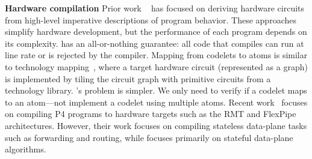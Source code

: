 \textbf{Hardware compilation}
Prior work ~\cite{nurvadathi, cash, bluespec} has focused on deriving hardware
circuits from high-level imperative descriptions of program behavior. These
approaches simplify hardware development, but the performance of each program
depends on its complexity.  \pktlanguage has an all-or-nothing guarantee: all
code that compiles can run at line rate or is rejected by the compiler.
Mapping from codelets to atoms is similar to technology mapping~\cite{micheli,
flowmap, spectransform}, where a target hardware circuit (represented as a
graph) is implemented by tiling the circuit graph with primitive circuits from
a technology library. \pktlanguage's problem is simpler. We only need to verify
if a codelet maps to an atom---not implement a codelet using multiple atoms.
Recent work~\cite{lavanya_compiler} focuses on compiling P4 programs to
hardware targets such as the RMT and FlexPipe architectures. However, their
work focuses on compiling stateless data-plane tasks such as forwarding and
routing, while \pktlanguage focuses primarily on stateful data-plane
algorithms.

